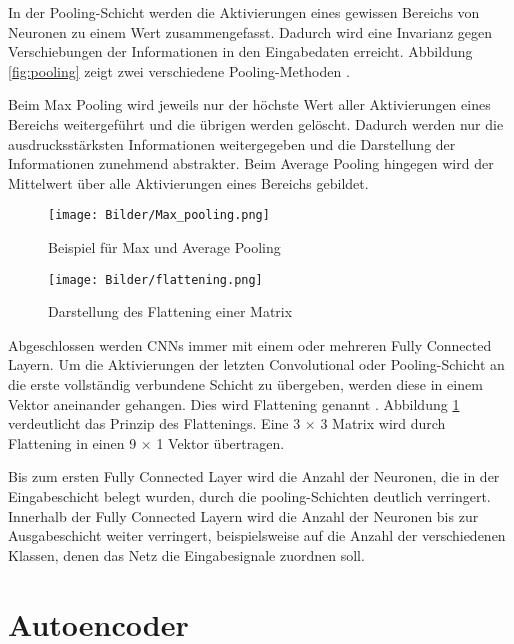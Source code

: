 In der Pooling-Schicht werden die Aktivierungen eines gewissen Bereichs von Neuronen zu einem Wert zusammengefasst. Dadurch wird eine Invarianz gegen Verschiebungen der Informationen in den Eingabedaten erreicht.  Abbildung \ref{fig:pooling} zeigt zwei verschiedene Pooling-Methoden \cite{Saha2018}. 

Beim Max Pooling wird jeweils nur der höchste Wert aller Aktivierungen eines Be\-reichs weitergeführt und die übrigen werden gelöscht. Dadurch werden nur die ausdrucksstärksten Informationen weitergegeben und die Darstellung der Informationen zunehmend abstrakter. Beim Average Pooling hingegen wird der Mittelwert über alle Aktivierungen eines Bereichs gebildet. 

\begin{figure}
	\centering
	\begin{minipage}[t]{0.45\linewidth}
		\centering
    		\texttt{[image: Bilder/Max\_pooling.png]}
    		\caption{Beispiel für Max und Average Pooling}
    		\label{fig:pooling}
	\end{minipage}
	\hfill
	\begin {minipage}[t]{0.45\linewidth}
		\centering
    \texttt{[image: Bilder/flattening.png]}
    \caption{Darstellung des Flattening einer Matrix}
    \label{fig:flattening}
	\end{minipage}
\end{figure}

Abgeschlossen werden CNNs immer mit einem oder mehreren Fully Connected Layern. Um die Aktivierungen der letzten Convolutional oder Pooling-Schicht an die erste vollständig verbundene Schicht zu übergeben, werden diese in einem Vektor aneinander gehangen. Dies wird Flattening genannt \cite{Saha2018}. Abbildung \ref{fig:flattening} verdeutlicht das Prinzip des Flattenings. Eine 3 $\times$ 3 Matrix wird durch Flattening in einen 9 $\times$ 1 Vektor übertragen.

Bis zum ersten Fully Connected Layer wird die Anzahl der Neuronen, die in der Eingabeschicht belegt wurden, durch die pooling-Schichten deutlich verringert. Innerhalb der Fully Connected Layern wird die Anzahl der Neuronen bis zur Ausgabeschicht weiter verringert, beispielsweise auf die Anzahl der verschiedenen Klassen, denen das Netz  die Eingabesignale zuordnen soll. 

\section[Autoencoder (Schmelzer)]{Autoencoder}

